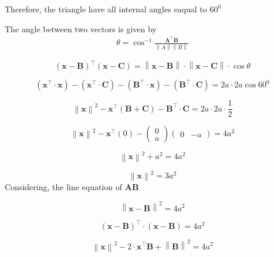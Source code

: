 \documentclass[journal,12pt,twocolumn]{IEEEtran}
\providecommand{\norm}[1]{\left\lVert#1\right\rVert}
\let\vec\mathbf
\newcommand{\myvec}[1]{\ensuremath{\begin{pmatrix}#1\end{pmatrix}}}
\providecommand{\brak}[1]{\ensuremath{\left(#1\right)}}
\begin{document}
\noindent Therefore, the  triangle have all internal angles eaqual to  $60^0$

The angle between two vectors is given by 
  \begin{align}
    \label{eq:angle2d}
    \theta = \cos^{-1}\frac{\vec{A}^{\top} \vec{B}}{\norm{A}\norm{B}}
  \end{align}

 \begin{equation}  
  \brak{\vec{x}-\vec{B}}^{\top} \brak{\vec{x}-\vec{C}}= \norm{\vec{x}-\vec{B}} \cdot \norm{\vec{x}-\vec{C}} \cdot \cos\theta 
 \end{equation}

 \begin{equation}  
\brak{\vec{x}^\top \cdot \vec{x}} - \brak{\vec{x}^\top \cdot \vec{C}} - \brak{\vec{B}^\top \cdot \vec{x}} - \brak{\vec{B}^\top \cdot \vec{C}} = 2a \cdot 2a \cos 60^0   
 \end{equation}

 \begin{equation}  
\norm{\vec{x}}^2 - \vec{x}^\top\brak{\vec{B}+\vec{C}} - \vec{B}^\top \cdot \vec{C} = 2a \cdot 2a \cdot \frac{1}{2}
 \end{equation}

  \begin{equation}  
\norm{\vec{x}}^2 - \vec{x}^\top\brak{0} -\myvec{0 \\ a} \myvec{0 & -a}  = 4a^2
 \end{equation}

\begin{equation}
\norm{\vec{x}}^2 + a^2 = 4a^2
\end{equation}

\begin{equation}
\norm{\vec{x}}^2 = 3a^2
\label{eq-1}
\end{equation}
Considering, the line equation of $\vec{AB}$

\begin{equation}
\norm{\vec{x}-\vec{B}}^2 = 4a^2
\end{equation}

\begin{equation}
\brak{\vec{x} -\vec{B}}^{\top} \cdot \brak{\vec{x}-\vec{B}} = 4a^2
\end{equation}

\begin{equation}
\norm{\vec{x}}^2-2\cdot \vec{x}^\top \vec{B} + \norm{\vec{B}}^2 = 4a^2
\end{equation}
\end{document}
